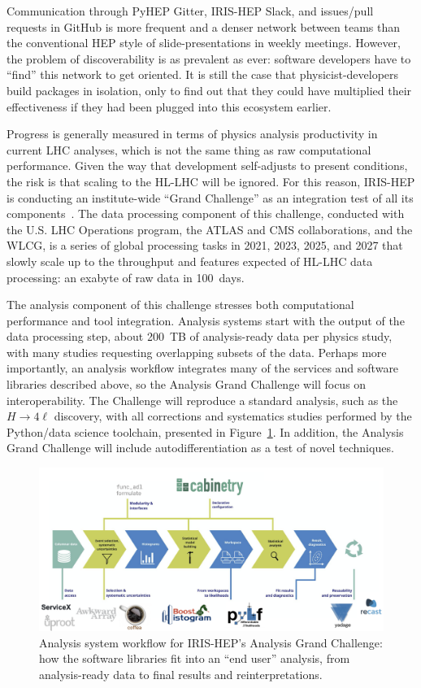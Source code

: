 \documentclass[12pt,a4paper]{article}
\begin{document}
Communication through PyHEP Gitter, IRIS-HEP Slack, and issues/pull requests in GitHub is more frequent and a denser network between teams than the conventional HEP style of slide-presentations in weekly meetings. However, the problem of discoverability is as prevalent as ever: software developers have to ``find'' this network to get oriented. It is still the case that physicist-developers build packages in isolation, only to find out that they could have multiplied their effectiveness if they had been plugged into this ecosystem earlier.

Progress is generally measured in terms of physics analysis productivity in current LHC analyses, which is not the same thing as raw computational performance. Given the way that development self-adjusts to present conditions, the risk is that scaling to the HL-LHC will be ignored. For this reason, IRIS-HEP is conducting an institute-wide ``Grand Challenge'' as an integration test of all its components~\cite{grand_challenge}.
%
The data processing component of this challenge, conducted with the U.S. LHC Operations program, the ATLAS and CMS collaborations, and the WLCG, is a series of global processing tasks in 2021, 2023, 2025, and 2027 that slowly scale up to the throughput and features expected of HL-LHC data processing: an exabyte of raw data in 100~days.

The analysis component of this challenge stresses both computational performance and tool integration. Analysis systems start with the output of the data processing step, about 200~TB of analysis-ready data per physics study, with many studies requesting overlapping subsets of the data. Perhaps more importantly, an analysis workflow integrates many of the services and software libraries described above, so the Analysis Grand Challenge will focus on interoperability. The Challenge will reproduce a standard analysis, such as the $H \to 4\ell$ discovery, with all corrections and systematics studies performed by the Python/data science toolchain, presented in Figure~\ref{fig:cabinetry-vertical-slice}. In addition, the Analysis Grand Challenge will include autodifferentiation as a test of novel techniques.

\begin{figure}
\centering
\includegraphics[width=\linewidth]{fig/cabinetry-vertical-slice.png}

\caption{Analysis system workflow for IRIS-HEP's Analysis Grand Challenge: how the software libraries fit into an ``end user'' analysis, from analysis-ready data to final results and reinterpretations. \label{fig:cabinetry-vertical-slice}}
\end{figure}
\end{document}
